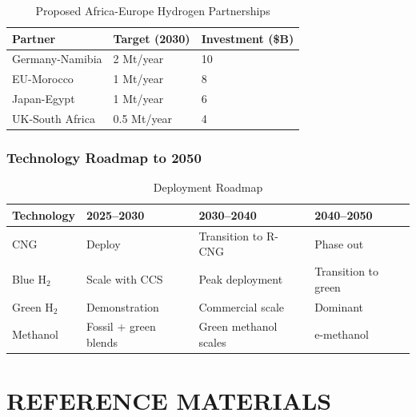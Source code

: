 \documentclass[12pt,twoside,openany]{book}
\begin{document}
\begin{table}[htbp]
    \centering
    \caption{Proposed Africa-Europe Hydrogen Partnerships}
    \label{tab:africa_partnerships}
    \begin{tabular}{L{4cm} C{3cm} C{3cm}}
    \hline
    \textbf{Partner} & \textbf{Target (2030)} & \textbf{Investment (\$B)} \\
    \hline
    Germany-Namibia & 2 Mt/year & 10 \\
    EU-Morocco & 1 Mt/year & 8 \\
    Japan-Egypt & 1 Mt/year & 6 \\
    UK-South Africa & 0.5 Mt/year & 4 \\
    \hline
    \end{tabular}
\end{table}

\section{Technology Roadmap to 2050}

\begin{table}[htbp]
    \centering
    \caption{Deployment Roadmap}
    \label{tab:roadmap}
    \begin{tabular}{L{3.5cm} C{3cm} C{3cm} C{3cm}}
    \hline
    \textbf{Technology} & \textbf{2025--2030} & \textbf{2030--2040} & \textbf{2040--2050} \\
    \hline
    CNG        & Deploy              & Transition to R-CNG     & Phase out            \\
    Blue H$_2$ & Scale with CCS      & Peak deployment         & Transition to green  \\
    Green H$_2$ & Demonstration      & Commercial scale        & Dominant             \\
    Methanol   & Fossil + green blends & Green methanol scales & e-methanol           \\
    \hline
    \end{tabular}
\end{table}


\part{REFERENCE MATERIALS}
\end{document}
